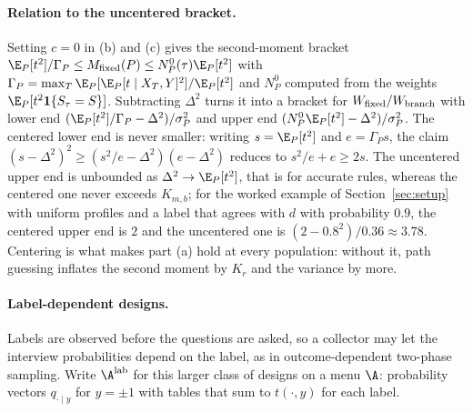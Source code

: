 \paragraph{Relation to the uncentered bracket.}
Setting $c=0$ in (b) and (c) gives the second-moment bracket
$\E_P[t^2]/\Gamma_P\le M_{\rm fixed}(P)\le N^0_P(\tau)\E_P[t^2]$ with
$\Gamma_P=\max_T\E_P[\E_P[t\mid X_T,Y]^2]/\E_P[t^2]$ and $N_P^0$ computed
from the weights $\E_P[t^2\mathbf 1\{S_\tau=S\}]$. Subtracting $\Delta^2$
turns it into a bracket for $W_{\rm fixed}/W_{\rm branch}$ with lower end
$(\E_P[t^2]/\Gamma_P-\Delta^2)/\sigma_P^2$ and upper end
$(N_P^0\E_P[t^2]-\Delta^2)/\sigma_P^2$. The centered lower end is never
smaller: writing $s=\E_P[t^2]$ and $e=\Gamma_Ps$, the claim
$(s-\Delta^2)^2\ge(s^2/e-\Delta^2)(e-\Delta^2)$ reduces to $s^2/e+e\ge2s$. The
uncentered upper end is unbounded as $\Delta^2\to\E_P[t^2]$, that is for
accurate rules, whereas the centered one never exceeds $K_{m,b}$; for the
worked example of Section~\ref{sec:setup} with uniform profiles and a label
that agrees with $d$ with probability $0.9$, the centered upper end is $2$ and
the uncentered one is $(2-0.8^2)/0.36\approx3.78$. Centering is what makes part (a) hold at every
population: without it, path guessing inflates the second moment by $K_r$
and the variance by more.

\paragraph{Label-dependent designs.}
Labels are observed before the questions are asked, so a collector may let
the interview probabilities depend on the label, as in outcome-dependent
two-phase sampling. Write $\A^{\rm lab}$ for this larger class of designs on a
menu $\A$: probability vectors $q_{\cdot\mid y}$ for $y=\pm1$ with tables that
sum to $t(\cdot,y)$ for each label.

